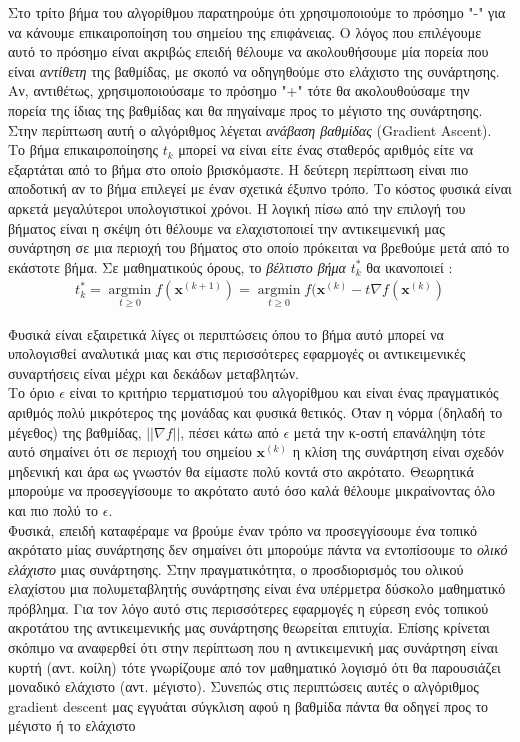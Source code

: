 \documentclass[11pt]{article} %
\numberwithin{equation}{subsection}
\begin{document}
Στο τρίτο βήμα του αλγορίθμου παρατηρούμε ότι χρησιμοποιούμε το πρόσημο "-" για να κάνουμε επικαιροποίηση του σημείου της επιφάνειας. Ο λόγος που επιλέγουμε αυτό το πρόσημο είναι ακριβώς επειδή θέλουμε να ακολουθήσουμε μία πορεία που είναι \textit{αντίθετη} της βαθμίδας, με σκοπό να οδηγηθούμε στο ελάχιστο της συνάρτησης. Αν, αντιθέτως, χρησιμοποιούσαμε το πρόσημο "+" τότε θα ακολουθούσαμε την πορεία της ίδιας της βαθμίδας και θα πηγαίναμε προς το μέγιστο της συνάρτησης. Στην περίπτωση αυτή ο αλγόριθμος λέγεται \textit{ανάβαση βαθμίδας} (Gradient Ascent).\\

Το βήμα επικαιροποίησης $t_{k}$  μπορεί να είναι είτε ένας σταθερός αριθμός είτε να εξαρτάται από το βήμα στο οποίο βρισκόμαστε. Η δεύτερη περίπτωση είναι πιο αποδοτική αν το βήμα επιλεγεί με έναν σχετικά έξυπνο τρόπο. Το κόστος φυσικά είναι αρκετά μεγαλύτεροι υπολογιστικοί χρόνοι. Η λογική πίσω από την επιλογή του βήματος είναι η σκέψη ότι θέλουμε να ελαχιστοποιεί την αντικειμενική μας συνάρτηση σε μια περιοχή του βήματος στο οποίο πρόκειται να βρεθούμε μετά από το εκάστοτε βήμα. Σε μαθηματικούς όρους, το \textit{βέλτιστο βήμα} $t_k ^ *$ θα ικανοποιεί \cite{graddes}:
\begin{align*}
t_k ^ * = \operatorname*{argmin}_{t \geq 0} f(\textbf{x}^{(k+1)}) = \operatorname*{argmin}_{t \geq 0} f(\textbf{x}^{(k)} - t \nabla f(\textbf{x}^{(k)})
\end{align*}

Φυσικά είναι εξαιρετικά λίγες οι περιπτώσεις όπου το βήμα αυτό μπορεί να υπολογισθεί αναλυτικά μιας και στις περισσότερες εφαρμογές οι αντικειμενικές συναρτήσεις είναι μέχρι και δεκάδων μεταβλητών.\\

Το όριο $\epsilon$ είναι το κριτήριο τερματισμού του αλγορίθμου και είναι ένας πραγματικός αριθμός πολύ μικρότερος της μονάδας και φυσικά θετικός. Όταν η νόρμα (δηλαδή το μέγεθος) της βαθμίδας, $||\nabla f||$, πέσει κάτω από $\epsilon$ μετά την κ-οστή επανάληψη τότε αυτό σημαίνει ότι σε περιοχή του σημείου $\textbf{x}^{(k)}$ η κλίση της συνάρτηση είναι σχεδόν μηδενική και άρα ως γνωστόν θα είμαστε πολύ κοντά στο ακρότατο. Θεωρητικά μπορούμε να προσεγγίσουμε το ακρότατο αυτό όσο καλά θέλουμε μικραίνοντας όλο και πιο πολύ το $\epsilon$.\\

Φυσικά, επειδή καταφέραμε να βρούμε έναν τρόπο να προσεγγίσουμε ένα τοπικό ακρότατο μίας συνάρτησης δεν σημαίνει ότι μπορούμε πάντα να εντοπίσουμε το \textit{ολικό ελάχιστο} μιας συνάρτησης. Στην πραγματικότητα, ο προσδιορισμός του ολικού ελαχίστου μια πολυμεταβλητής συνάρτησης είναι ένα υπέρμετρα δύσκολο μαθηματικό πρόβλημα. Για τον λόγο αυτό στις περισσότερες εφαρμογές η εύρεση ενός τοπικού ακροτάτου της αντικειμενικής μας συνάρτησης θεωρείται επιτυχία. Επίσης κρίνεται σκόπιμο να αναφερθεί ότι στην περίπτωση που η αντικειμενική μας συνάρτηση είναι κυρτή (αντ. κοίλη) τότε γνωρίζουμε από τον μαθηματικό λογισμό ότι θα παρουσιάζει μοναδικό ελάχιστο (αντ. μέγιστο). Συνεπώς στις περιπτώσεις αυτές ο αλγόριθμος gradient descent μας εγγυάται σύγκλιση αφού η βαθμίδα πάντα θα οδηγεί προς το μέγιστο ή το ελάχιστο  \\
\end{document}
